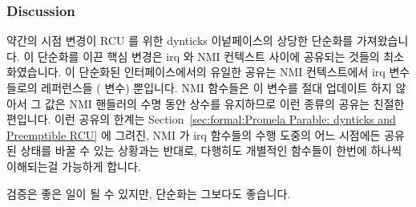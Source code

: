 \subsubsection{Discussion}
\label{sec:formal:Discussion}

약간의 시점 변경이 RCU 를 위한 dynticks 이넡페이스의 상당한 단순화를
가져왔습니다.
이 단순화를 이끈 핵심 변경은 irq 와 NMI 컨텍스트 사이에 공유되는 것들의
최소화였습니다.
이 단순화된 인터페이스에서의 유일한 공유는 NMI 컨텍스트에서 irq 변수들로의
레퍼런스들 ( 변수) 뿐입니다.
NMI 함수들은 이 변수를 절대 업데이트 하지 않아서 그 값은 NMI 핸들러의 수명 동안
상수를 유지하므로 이런 종류의 공유는 친절한 편입니다.
이런 공유의 한계는
Section~\ref{sec:formal:Promela Parable: dynticks and Preemptible RCU} 에
그려진, NMI 가 irq 함수들의 수행 도중의 어느 시점에든 공유된 상태를 바꿀 수
있는 상황과는 반대로, 다행히도
개별적인 함수들이 한번에 하나씩 이해되는걸 가능하게 합니다.

검증은 좋은 일이 될 수 있지만, 단순화는 그보다도 좋습니다.
\iffalse

A slight shift in viewpoint resulted in a substantial simplification
of the dynticks interface for RCU.
The key change leading to this simplification was minimizing of
sharing between irq and NMI contexts.
The only sharing in this simplified interface is references from NMI
context to irq variables (the \co{dynticks} variable).
This type of sharing is benign, because the NMI functions never update
this variable, so that its value remains constant through the lifetime
of the NMI handler.
This limitation of sharing allows the individual functions to be
understood one at a time, in happy contrast to the situation
described in
Section~\ref{sec:formal:Promela Parable: dynticks and Preemptible RCU},
where an NMI might change shared state at any point during execution of
the irq functions.

Verification can be a good thing, but simplicity is even better.
\fi
